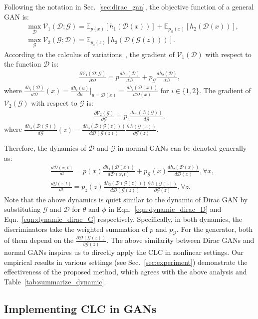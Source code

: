 \documentclass{article}
\newcommand{\ep}{\mathbb{E}}
\newcommand{\xG}{\mathcal{G}}
\newcommand{\xD}{\mathcal{D}}
\newcommand{\uV}{\mathcal{V}}
\newcommand{\tabl}[1]{Table~\ref{tab:#1}}
\newcommand{\eqn}[1]{Eqn.~\eqref{eqn:#1}}
\newcommand{\secref}[1]{Sec.~\ref{sec:#1}} \usepackage{wrapfig}
\theoremstyle{definition}
\begin{document}
Following the notation in \secref{dirac_gan}, the objective function of a general GAN is:
\begin{align}
& \max_{\xD} \uV_1(\xD; \xG) = \ep_{p(x)}[h_1(\xD(x))] + \ep_{p_\xG(x)}[h_2(\xD(x))], \nonumber\\
& \max_{\xG} \uV_2(\xG; \xD) = \ep_{p_z(z)} [h_3(\xD(\xG(z)))].
\end{align}
According to the calculus of variations~\citep{gelfand2000calculus}, the gradient of $\uV_1(\xD)$ with respect to the function $\xD$ is:
\begin{align}
\frac{\partial \uV_1(\xD; \xG)}{\partial \xD} = p\frac{d h_1(\xD)}{d\xD}+ p_\xG\frac{d h_2(\xD) }{d\xD},
\end{align}
where $\frac{dh_i(\xD)}{d\xD}(x) = \frac{dh_i(u)}{du}|_{u=\xD(x)} = \frac{d h_i(\xD(x))}{d \xD(x)}$ for $i \in \{1, 2\}$.
The gradient of $\uV_2(\xG)$ with respect to $\xG$ is:
\begin{align}
\frac{\partial \uV_2(\xG)}{\partial \xG} = p_z \frac{d h_3(\xD(\xG))}{d\xG},
\end{align}
where $\frac{d h_3(\xD(\xG))}{d\xG}(z) = \frac{d h_3(\xD(\xG(z)))}{d \xD(\xG(z))}\frac{\partial \xD(\xG(z))}{\partial \xG(z)}$.


Therefore, the dynamics of $\xD$ and $\xG$ in normal GANs can be denoted generally as:
\begin{align}
&\frac{d\xD(x, t)}{dt} = p(x)\frac{d h_1(\xD(x))}{d\xD(x,t)}+ p_\xG(x)\frac{d h_2(\xD(x)) }{d\xD(x)}, \forall x,\nonumber \\
&\frac{d\xG(z, t)}{dt} = p_z(z)\frac{d h_3(\xD(\xG(z)))}{d \xD(\xG(z))}\frac{\partial \xD(\xG(z))}{\partial \xG(z)}, \forall z.
\end{align}
Note that the above dynamics is quiet similar to the dynamic of Dirac GAN by substituting $\xG$ and $\xD$ for $\theta$ and $\phi$ in \eqn{dynamic_dirac_D} and \eqn{dynamic_dirac_G} respectively.
Specifically, in both dynamics, the discriminators take the weighted summation of $p$ and $p_\xG$. For the generator, both of them depend on the $\frac{\partial \xD(\xG(z))}{\partial \xG(z)}$.
The above similarity between Dirac GANs and normal GANs inspires us to directly apply the CLC in nonlinear settings. Our empirical results in various settings (see \secref{experiment}) demonstrate the effectiveness of the proposed method, which agrees with the above analysis and \tabl{summarize_dynamic}.




\subsection{Implementing CLC in GANs}
\label{sec:implementation}
\end{document}
